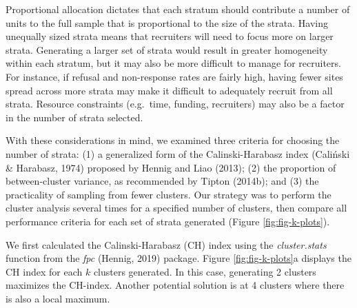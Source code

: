 \documentclass[
  english,
  man,floatsintext]{apa6}
\begin{document}
Proportional allocation dictates that each stratum should contribute a number of units to the full sample that is proportional to the size of the strata. Having unequally sized strata means that recruiters will need to focus more on larger strata. Generating a larger set of strata would result in greater homogeneity within each stratum, but it may also be more difficult to manage for recruiters. For instance, if refusal and non-response rates are fairly high, having fewer sites spread across more strata may make it difficult to adequately recruit from all strata. Resource constraints (e.g.~time, funding, recruiters) may also be a factor in the number of strata selected.

With these considerations in mind, we examined three criteria for choosing the number of strata: (1) a generalized form of the Calinski-Harabasz index (Caliński \& Harabasz, 1974) proposed by Hennig and Liao (2013); (2) the proportion of between-cluster variance, as recommended by Tipton (2014b); and (3) the practicality of sampling from fewer clusters. Our strategy was to perform the cluster analysis several times for a specified number of clusters, then compare all performance criteria for each set of strata generated (Figure \ref{fig:fig-k-plots}).

We first calculated the Calinski-Harabasz (CH) index using the \emph{cluster.stats} function from the \emph{fpc} (Hennig, 2019) package. Figure \ref{fig:fig-k-plots}a displays the CH index for each \(k\) clusters generated. In this case, generating 2 clusters maximizes the CH-index. Another potential solution is at 4 clusters where there is also a local maximum.
\end{document}
